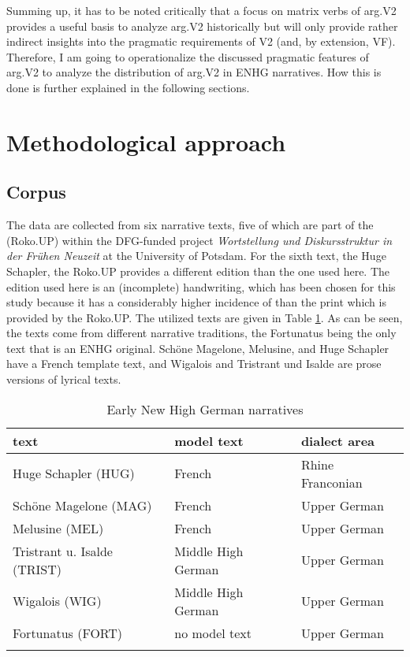 \documentclass[output=paper,colorlinks,citecolor=brown]{langscibook}
\begin{document}
Summing up, it has to be noted critically that a focus on matrix verbs of arg.V2 provides a useful basis to analyze arg.V2 historically but will only provide rather indirect insights into the pragmatic requirements of V2 (and, by extension, VF). Therefore, I am going to operationalize the discussed pragmatic features of arg.V2 to analyze the distribution of arg.V2 in ENHG narratives. How this is done is further explained in the following sections.

\section{Methodological approach}\label{sec:reetz:4}

\subsection{Corpus}\label{sec:reetz:1.1}
The data are collected from six narrative texts, five of which  are part of the  (Roko.UP) \citep{BloomEtAl2023} within the DFG-funded project \textit{Wortstellung und Diskursstruktur in der Frühen Neuzeit} at the University of Potsdam. For the sixth text, the Huge Schapler, the Roko.UP provides a different edition than the one used here. The edition used here is an (incomplete) handwriting, which has been chosen for this study because it has a considerably higher incidence of  than the print which is provided by the Roko.UP. The utilized texts are given in Table \ref{tab:myname:texts}. As can be seen, the texts come from different narrative traditions, the Fortunatus being the only text that is an ENHG original. Schöne Magelone, Melusine, and Huge Schapler have a French template text, and Wigalois and Tristrant und Isalde are prose versions of  lyrical texts.

\begin{table}
\caption{Early New High German narratives}
\label{tab:myname:texts}
 \begin{tabularx}{0.95\textwidth}{lll}
  \lsptoprule
    text  & model text & dialect area\\
  \midrule
  Huge Schapler (HUG) & French  & Rhine Franconian\\
  Schöne Magelone (MAG) & French & Upper German\\
  Melusine (MEL) & French & Upper German\\
  Tristrant u. Isalde (TRIST) & Middle High German & Upper German\\
  Wigalois (WIG) & Middle High German & Upper German \\
  Fortunatus (FORT) & no model text & Upper German \\
  \lspbottomrule
 \end{tabularx}
\end{table}
\end{document}
